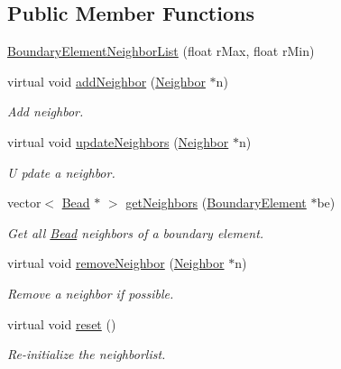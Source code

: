 \subsection*{Public Member Functions}
\begin{DoxyCompactItemize}
\item 
\hyperlink{classBoundaryElementNeighborList_a84cc0a08aa4d985fa708ead757e90a93}{Boundary\+Element\+Neighbor\+List} (float r\+Max, float r\+Min)
\item 
virtual void \hyperlink{classBoundaryElementNeighborList_a39ce6b818ef3fd745fae6b5d45e9c3aa}{add\+Neighbor} (\hyperlink{classNeighbor}{Neighbor} $\ast$n)
\begin{DoxyCompactList}\small\item\em Add neighbor. \end{DoxyCompactList}\item 
virtual void \hyperlink{classBoundaryElementNeighborList_a1af8a9581758cf2ddbf82318570876e5}{update\+Neighbors} (\hyperlink{classNeighbor}{Neighbor} $\ast$n)
\begin{DoxyCompactList}\small\item\em U pdate a neighbor. \end{DoxyCompactList}\item 
vector$<$ \hyperlink{classBead}{Bead} $\ast$ $>$ \hyperlink{classBoundaryElementNeighborList_af2114492e49ddeb5da9ddddd81afc4bd}{get\+Neighbors} (\hyperlink{classBoundaryElement}{Boundary\+Element} $\ast$be)
\begin{DoxyCompactList}\small\item\em Get all \hyperlink{classBead}{Bead} neighbors of a boundary element. \end{DoxyCompactList}\item 
virtual void \hyperlink{classNeighborList_aa64ee01bc18598fae6906ca6d5dcc7d6}{remove\+Neighbor} (\hyperlink{classNeighbor}{Neighbor} $\ast$n)
\begin{DoxyCompactList}\small\item\em Remove a neighbor if possible. \end{DoxyCompactList}\item 
virtual void \hyperlink{classNeighborList_a93a07ead9349edba7d763b483ec42847}{reset} ()
\begin{DoxyCompactList}\small\item\em Re-\/initialize the neighborlist. \end{DoxyCompactList}\end{DoxyCompactItemize}

